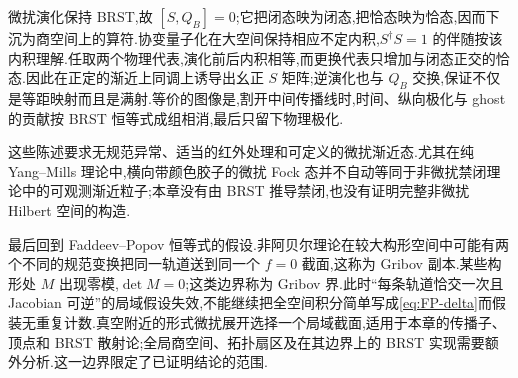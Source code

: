 微扰演化保持 BRST,故 $[S,Q_B]=0$;它把闭态映为闭态,把恰态映为恰态,因而下沉为商空间上的算符.协变量子化在大空间保持相应不定内积,$S^\dagger S=1$ 的伴随按该内积理解.任取两个物理代表,演化前后内积相等,而更换代表只增加与闭态正交的恰态.因此在正定的渐近上同调上诱导出幺正 $S$ 矩阵;逆演化也与 $Q_B$ 交换,保证不仅是等距映射而且是满射.等价的图像是,割开中间传播线时,时间、纵向极化与 ghost 的贡献按 BRST 恒等式成组相消,最后只留下物理极化.

这些陈述要求无规范异常、适当的红外处理和可定义的微扰渐近态.尤其在纯 Yang--Mills 理论中,横向带颜色胶子的微扰 Fock 态并不自动等同于非微扰禁闭理论中的可观测渐近粒子;本章没有由 BRST 推导禁闭,也没有证明完整非微扰 Hilbert 空间的构造.

最后回到 Faddeev--Popov 恒等式的假设.非阿贝尔理论在较大构形空间中可能有两个不同的规范变换把同一轨道送到同一个 $f=0$ 截面,这称为 Gribov 副本.某些构形处 $M$ 出现零模,$\det M=0$;这类边界称为 Gribov 界.此时“每条轨道恰交一次且 Jacobian 可逆”的局域假设失效,不能继续把全空间积分简单写成\eqref{eq:FP-delta}而假装无重复计数.真空附近的形式微扰展开选择一个局域截面,适用于本章的传播子、顶点和 BRST 散射论;全局商空间、拓扑扇区及在其边界上的 BRST 实现需要额外分析.这一边界限定了已证明结论的范围.
